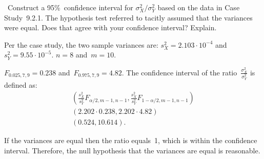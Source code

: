 \begin{problem}
  ~Construct a 95\%~confidence interval for ${\sigma_{X}^2 / \sigma_{Y}^2}$ based on the data in Case Study~9.2.1.  The hypothesis test referred to tacitly assumed that the variances were equal.  Does that agree with your confidence interval? Explain.
\end{problem}

\noindent
Per the case study, the two sample variances are: ${s_{X}^2 = 2.103 \cdot 10^{-4}}$ and~${s_{Y}^2 = 9.55 \cdot 10^{-5}}$. ${n = 8}$ and~${m = 10}$.

${F_{0.025,7,9} = 0.238}$ and~${F_{0.975,7,9} = 4.82}$. The confidence interval of the ratio~$\frac{\sigma_{X}^2}{\sigma_{Y}^2}$ is defined as:
\begin{align}
  \left(\frac{s_{X}^2}{s_{Y}^2} F_{\alpha/2,m-1,n-1}, \frac{s_{X}^2}{s_{Y}^2} F_{1-\alpha/2,m-1,n-1} \right) \\
  \left(2.202 \cdot 0.238, 2.202 \cdot 4.82 \right) \\
  \left(0.524,10.614\right) \text{.}
\end{align}

If the variances are equal then the ratio equals~1, which is within the confidence interval.  Therefore, the null hypothesis that the variances are equal is reasonable.
